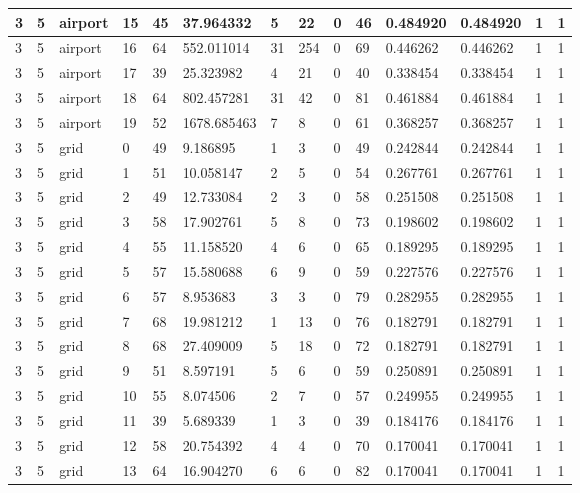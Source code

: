 \documentclass[../thesis.tex]{subfiles}
\begin{document}
\begin{table}[!ht]
\begin{tabularx}{\textwidth}{|X|X|X|X|X|X|X|X|X|X|X|X|X|X|}
        3 & 5 & airport & 15 & 45 & 37.964332 & 5 & 22 & 0 & 46 & 0.484920 & 0.484920 & 1 & 1 \\ \hline
        3 & 5 & airport & 16 & 64 & 552.011014 & 31 & 254 & 0 & 69 & 0.446262 & 0.446262 & 1 & 1 \\ \hline
        3 & 5 & airport & 17 & 39 & 25.323982 & 4 & 21 & 0 & 40 & 0.338454 & 0.338454 & 1 & 1 \\ \hline
        3 & 5 & airport & 18 & 64 & 802.457281 & 31 & 42 & 0 & 81 & 0.461884 & 0.461884 & 1 & 1 \\ \hline
        3 & 5 & airport & 19 & 52 & 1678.685463 & 7 & 8 & 0 & 61 & 0.368257 & 0.368257 & 1 & 1 \\ \hline
        3 & 5 & grid & 0 & 49 & 9.186895 & 1 & 3 & 0 & 49 & 0.242844 & 0.242844 & 1 & 1 \\ \hline
        3 & 5 & grid & 1 & 51 & 10.058147 & 2 & 5 & 0 & 54 & 0.267761 & 0.267761 & 1 & 1 \\ \hline
        3 & 5 & grid & 2 & 49 & 12.733084 & 2 & 3 & 0 & 58 & 0.251508 & 0.251508 & 1 & 1 \\ \hline
        3 & 5 & grid & 3 & 58 & 17.902761 & 5 & 8 & 0 & 73 & 0.198602 & 0.198602 & 1 & 1 \\ \hline
        3 & 5 & grid & 4 & 55 & 11.158520 & 4 & 6 & 0 & 65 & 0.189295 & 0.189295 & 1 & 1 \\ \hline
        3 & 5 & grid & 5 & 57 & 15.580688 & 6 & 9 & 0 & 59 & 0.227576 & 0.227576 & 1 & 1 \\ \hline
        3 & 5 & grid & 6 & 57 & 8.953683 & 3 & 3 & 0 & 79 & 0.282955 & 0.282955 & 1 & 1 \\ \hline
        3 & 5 & grid & 7 & 68 & 19.981212 & 1 & 13 & 0 & 76 & 0.182791 & 0.182791 & 1 & 1 \\ \hline
        3 & 5 & grid & 8 & 68 & 27.409009 & 5 & 18 & 0 & 72 & 0.182791 & 0.182791 & 1 & 1 \\ \hline
        3 & 5 & grid & 9 & 51 & 8.597191 & 5 & 6 & 0 & 59 & 0.250891 & 0.250891 & 1 & 1 \\ \hline
        3 & 5 & grid & 10 & 55 & 8.074506 & 2 & 7 & 0 & 57 & 0.249955 & 0.249955 & 1 & 1 \\ \hline
        3 & 5 & grid & 11 & 39 & 5.689339 & 1 & 3 & 0 & 39 & 0.184176 & 0.184176 & 1 & 1 \\ \hline
        3 & 5 & grid & 12 & 58 & 20.754392 & 4 & 4 & 0 & 70 & 0.170041 & 0.170041 & 1 & 1 \\ \hline
        3 & 5 & grid & 13 & 64 & 16.904270 & 6 & 6 & 0 & 82 & 0.170041 & 0.170041 & 1 & 1 \\ \hline

\end{tabularx}
\end{table}
\end{document}
